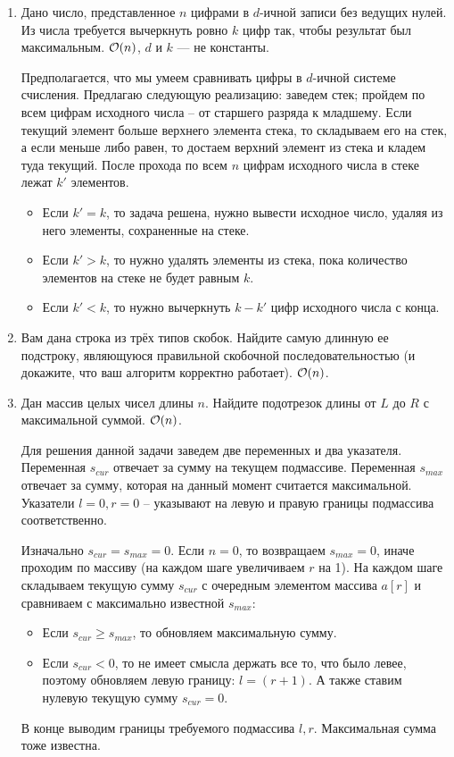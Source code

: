 \begin{enumerate}
  \item
    Дано число, представленное $n$ цифрами в $d$-ичной записи без
    ведущих нулей.  Из числа требуется вычеркнуть ровно $k$ цифр так,
    чтобы результат был максимальным. $\mathcal{O}(n)$, $d$ и $k$ --- не константы.
    \begin{solution}
      Предполагается, что мы умеем сравнивать цифры в $d$-ичной системе счисления. Предлагаю следующую реализацию: заведем стек; пройдем по всем цифрам исходного числа -- от старшего разряда к младшему. Если текущий элемент больше верхнего элемента стека, то складываем его на стек, а если меньше либо равен, то достаем верхний элемент из стека и кладем туда текущий. После прохода по всем $n$ цифрам исходного числа в стеке лежат $k'$ элементов.
      \begin{itemize}
        \item Если $k' = k$, то задача решена, нужно вывести исходное число, удаляя из него элементы, сохраненные на стеке.
        \item Если $k' > k$, то нужно удалять элементы из стека, пока количество элементов на стеке не будет равным $k$.
        \item Если $k' < k$, то нужно вычеркнуть $k - k'$ цифр исходного числа с конца.
      \end{itemize}
    \end{solution}
    
  \item {}
    Вам дана строка из трёх типов скобок. Найдите самую длинную ее
    подстроку, являющуюся правильной скобочной последовательностью
    (и докажите, что ваш алгоритм корректно работает). $\mathcal{O}(n)$.

  \item
    Дан массив целых чисел длины $n$. Найдите подотрезок длины
    от $L$ до $R$ с максимальной суммой. $\mathcal{O}(n)$.
    \begin{solution}
      Для решения данной задачи заведем две переменных и два указателя. Переменная $s_{cur}$ отвечает за сумму на текущем подмассиве. Переменная $s_{max}$ отвечает за сумму, которая на данный момент считается максимальной. Указатели $l = 0, r = 0$ -- указывают на левую и правую границы подмассива соответственно.

      Изначально $s_{cur} = s_{max} = 0$. Если $n = 0$, то возвращаем $s_{max} = 0$, иначе проходим по массиву (на каждом шаге увеличиваем $r$ на 1). На каждом шаге складываем текущую сумму $s_{cur}$ с очередным элементом массива $a[r]$ и сравниваем с максимально известной $s_{max}$:
      \begin{itemize}
        \item Если $s_{cur} \geq s_{max}$, то обновляем максимальную сумму.
        \item Если $s_{cur} < 0$, то не имеет смысла держать все то, что было левее, поэтому обновляем левую границу: $l = (r + 1)$. А также ставим нулевую текущую сумму $s_{cur} = 0$.
      \end{itemize}
      В конце выводим границы требуемого подмассива $l, r$. Максимальная сумма тоже известна.
    \end{solution}


\end{enumerate}
